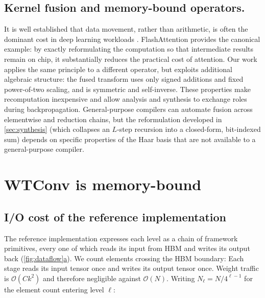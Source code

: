 \documentclass[10pt]{article} %
\theoremstyle{plain}
\begin{document}
\subsection{Kernel fusion and memory-bound operators.} It is well established that data movement, rather than arithmetic, is often the dominant cost in deep learning workloads \citep{ivanov2021datamovement,wahib2014kernelfusion}. FlashAttention \citep{dao2022flashattention,dao2024flashattention2} provides the canonical example: by exactly reformulating the computation so that intermediate results remain on chip, it substantially reduces the practical cost of attention. Our work applies the same principle to a different operator, but exploits additional algebraic structure: the fused transform uses only signed additions and fixed power-of-two scaling, and is symmetric and self-inverse. These properties make recomputation inexpensive and allow analysis and synthesis to exchange roles during backpropagation. General-purpose compilers \citep{ragankelley2013halide,chen2018tvm,sabne2020xla,ansel2024pytorch2} can automate fusion across elementwise and reduction chains, but the reformulation developed in \autoref{sec:synthesis} (which collapses an $L$-step recursion into a closed-form, bit-indexed sum) depends on specific properties of the Haar basis that are not available to a general-purpose compiler.


\section{WTConv is memory-bound}
\label{sec:memorybound}

\subsection{I/O cost of the reference implementation}

The reference implementation expresses each level as a chain of framework primitives, every one of which reads its input from HBM and writes its output back (\hyperref[fig:dataflow]{\autoref*{fig:dataflow}a}). We count elements crossing the HBM boundary: Each stage reads its input tensor once and writes its output tensor once. Weight traffic is $\mathcal{O}(Ck^2)$ and therefore negligible against $\mathcal{O}(N)$. Writing $N_\ell = N/4^{\ell-1}$ for the element count entering level $\ell$:
\end{document}
